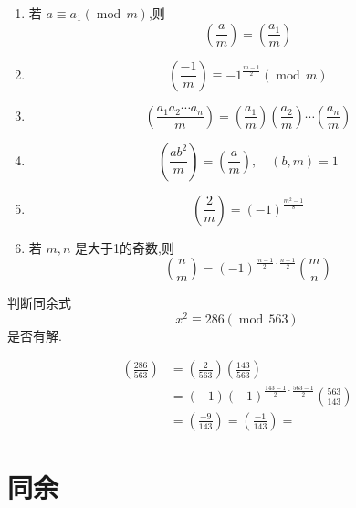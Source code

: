 \documentclass[lang=cn,12pt,color=green,fontset=none]{elegantbook}
\begin{document}
\begin{proposition}
    \begin{enumerate}
        \item 若 \(  a\equiv a_1\left( \operatorname{mod}\,m \right)   \),则 \[
        \left( \frac{a }{m }  \right) =  \left( \frac{a_1 }{m }  \right)  
        \] 
        \item  \[
        \left( \frac{-1 }{m}  \right)\equiv {-1}^{\frac{m-1 }{2 }  }\left( \operatorname{mod}\,m\right)  
        \]
        \item \[
            \left(\frac{a_1a_2\cdots a_n}{m}\right)=\left(\frac{a_1}{m}\right)\left(\frac{a_2}{m}\right)\cdots\left(\frac{a_n}{m}\right)
        \]
        \item \[
        \left( \frac{ a b^{2} }{ m}  \right) =  \left( \frac{a }{m }     \right),\quad \left( b,m \right)= 1  
        \]
        
        \item \[
        \left( \frac{2 }{m }  \right) =  \left( -1 \right)^{\frac{m^{2}-1 }{ 8} }  
        \]
       
        \item  若 \(  m,n  \) 是大于1的奇数,则 \[
        \left( \frac{n   }{m }  \right) =  \left( -1 \right)^{ \frac{m-1 }{2 }\cdot \frac{n-1 }{2 }  }  \left( \frac{m }{n }  \right) 
        \]  
    \end{enumerate}
\end{proposition}

\begin{exercise}
    判断同余式 \[
    x^{2}\equiv 286\left( \operatorname{mod}\,563 \right) 
    \]是否有解.    
\end{exercise}
\begin{solution}
     \[
     \begin{aligned}
     \left( \frac{286 }{563 }  \right)&  =    \left( \frac{2 }{563 }  \right)\left( \frac{143 }{563 }  \right)  \\ 
      & =  \left( -1 \right) \left( -1 \right)^{\frac{143-1 }{ 2} \cdot \frac{563-1 }{2 } } \left( \frac{563 }{143 }  \right)  \\ 
       & =  \left( \frac{-9 }{143 }  \right) =  \left( \frac{-1 }{143 }  \right)  =   
     \end{aligned}
     \]
\end{solution}

\chapter{同余}
\end{document}

